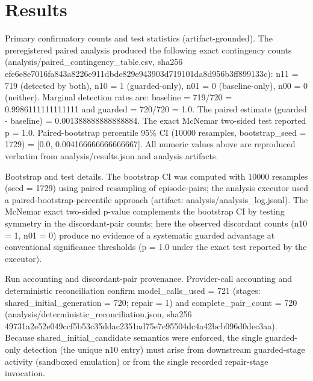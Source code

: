 \documentclass[conference]{IEEEtran}
\begin{document}
\section{Results}
Primary confirmatory counts and test statistics (artifact-grounded). The preregistered paired analysis produced the following exact contingency counts (analysis/paired\_contingency\_table.csv, sha256 efe6e8e7\allowbreak{}016fa843\allowbreak{}a8226e91\allowbreak{}1dbde829\allowbreak{}e943903d\allowbreak{}719101da\allowbreak{}8d956b3f\allowbreak{}f899133c): n11 = 719 (detected by both), n10 = 1 (guarded-only), n01 = 0 (baseline-only), n00 = 0 (neither). Marginal detection rates are: baseline = 719/720 = 0.9986111111111111 and guarded = 720/720 = 1.0. The paired estimate (guarded - baseline) = 0.001388888888888884. The exact McNemar two-sided test reported p = 1.0. Paired-bootstrap percentile 95\% CI (10000 resamples, bootstrap\_seed = 1729) = [0.0, 0.004166666666666667]. All numeric values above are reproduced verbatim from analysis/results.json and analysis artifacts.

Bootstrap and test details. The bootstrap CI was computed with 10000 resamples (seed = 1729) using paired resampling of episode-pairs; the analysis executor used a paired-bootstrap-percentile approach (artifact: analysis/analysis\_log.jsonl). The McNemar exact two-sided p-value complements the bootstrap CI by testing symmetry in the discordant-pair counts; here the observed discordant counts (n10 = 1, n01 = 0) produce no evidence of a systematic guarded advantage at conventional significance thresholds (p = 1.0 under the exact test reported by the executor).

Run accounting and discordant-pair provenance. Provider-call accounting and deterministic reconciliation confirm model\_calls\_used = 721 (stages: shared\_initial\_generation = 720; repair = 1) and complete\_pair\_count = 720 (analysis/deterministic\_reconciliation.json, sha256 49731a2e\allowbreak{}52e049cc\allowbreak{}f5b53c35\allowbreak{}ddac2351\allowbreak{}ad75e7e9\allowbreak{}5504dc4a\allowbreak{}42bcb096\allowbreak{}d0dec3aa). Because shared\_initial\_candidate semantics were enforced, the single guarded-only detection (the unique n10 entry) must arise from downstream guarded-stage activity (sandboxed emulation) or from the single recorded repair-stage invocation.
\end{document}
